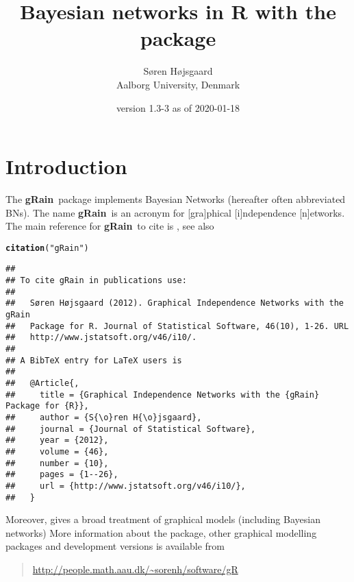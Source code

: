 \documentclass[10pt]{article}\usepackage[]{graphicx}\usepackage[]{color}
\author{S{\o}ren H{\o}jsgaard\\Aalborg University, Denmark}
\title{Bayesian networks in R with the \pkg{gRain} package}
\date{\pkg{gRain} version 1.3-3 as of 2020-01-18}
\makeatletter
\newcommand{\hlstr}[1]{\textcolor[rgb]{0.192,0.494,0.8}{#1}}%
\newcommand{\hlstd}[1]{\textcolor[rgb]{0.345,0.345,0.345}{#1}}%
\newcommand{\hlkwd}[1]{\textcolor[rgb]{0.737,0.353,0.396}{\textbf{#1}}}%
\newenvironment{kframe}{%
 \def\at@end@of@kframe{}%
 \ifinner\ifhmode%
  \def\at@end@of@kframe{\end{minipage}}%
  \begin{minipage}{\columnwidth}%
 \fi\fi%
 \def\FrameCommand##1{\hskip\@totalleftmargin \hskip-\fboxsep
 \colorbox{shadecolor}{##1}\hskip-\fboxsep
     \hskip-\linewidth \hskip-\@totalleftmargin \hskip\columnwidth}%
 \MakeFramed {\advance\hsize-\width
   \@totalleftmargin\z@ \linewidth\hsize
   \@setminipage}}%
 {\par\unskip\endMakeFramed%
 \at@end@of@kframe}
\newenvironment{knitrout}{}{} %
\def\grbn{{\bf gRain}}
\makeatother
\begin{document}
\maketitle
\tableofcontents
\parindent0pt\parskip5pt

\section{Introduction}

The \grbn\ package implements Bayesian Networks (hereafter often
abbreviated BNs). The name \grbn\ is an acronym for [gra]phical
[i]ndependence [n]etworks. The main reference for \grbn\ to cite is
\cite{hoj:12}, see also

\begin{knitrout}
\color{fgcolor}\begin{kframe}
\begin{alltt}
\hlkwd{citation}\hlstd{(}\hlstr{"gRain"}\hlstd{)}
\end{alltt}
\begin{verbatim}
## 
## To cite gRain in publications use:
## 
##   Søren Højsgaard (2012). Graphical Independence Networks with the gRain
##   Package for R. Journal of Statistical Software, 46(10), 1-26. URL
##   http://www.jstatsoft.org/v46/i10/.
## 
## A BibTeX entry for LaTeX users is
## 
##   @Article{,
##     title = {Graphical Independence Networks with the {gRain} Package for {R}},
##     author = {S{\o}ren H{\o}jsgaard},
##     journal = {Journal of Statistical Software},
##     year = {2012},
##     volume = {46},
##     number = {10},
##     pages = {1--26},
##     url = {http://www.jstatsoft.org/v46/i10/},
##   }
\end{verbatim}
\end{kframe}
\end{knitrout}

Moreover, \cite{hoj:edw:lau:12} gives a broad treatment of graphical
models (including Bayesian networks) More information about the
package, other graphical modelling packages and development versions
is available from

\begin{quote}
\url{http://people.math.aau.dk/~sorenh/software/gR}
\end{quote}

\end{document}
